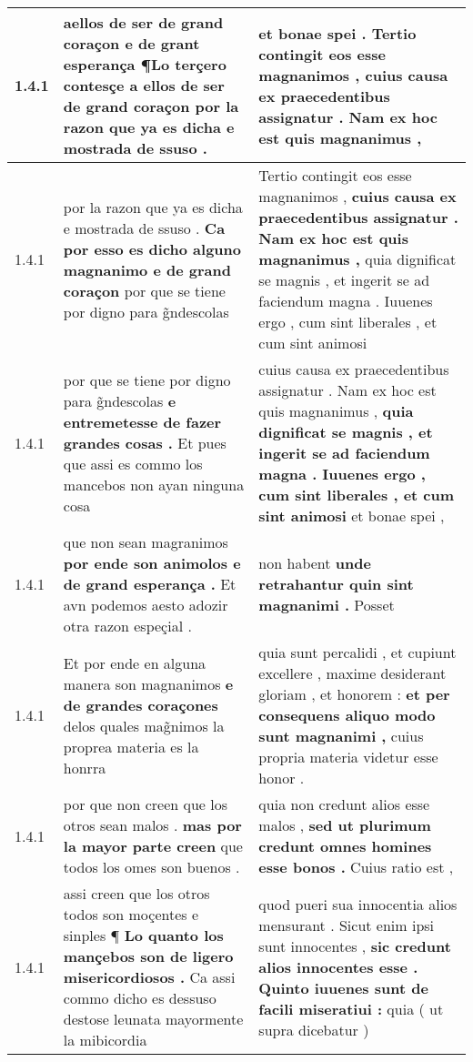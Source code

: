 \begin{tabular}{|p{1cm}|p{6.5cm}|p{6.5cm}|}
1.4.1 & aellos de ser de grand coraçon e de grant esperança \textbf{ ¶Lo terçero contesçe a ellos de ser de grand coraçon } por la razon que ya es dicha e mostrada de ssuso . & et bonae spei . \textbf{ Tertio contingit eos esse magnanimos , } cuius causa ex praecedentibus assignatur . Nam ex hoc est quis magnanimus , \\\hline
1.4.1 & por la razon que ya es dicha e mostrada de ssuso . \textbf{ Ca por esso es dicho alguno magnanimo e de grand coraçon } por que se tiene por digno para g̃ndescolas & Tertio contingit eos esse magnanimos , \textbf{ cuius causa ex praecedentibus assignatur . Nam ex hoc est quis magnanimus , } quia dignificat se magnis , et ingerit se ad faciendum magna . Iuuenes ergo , cum sint liberales , et cum sint animosi \\\hline
1.4.1 & por que se tiene por digno para g̃ndescolas \textbf{ e entremetesse de fazer grandes cosas . } Et pues que assi es commo los mancebos non ayan ninguna cosa & cuius causa ex praecedentibus assignatur . Nam ex hoc est quis magnanimus , \textbf{ quia dignificat se magnis , et ingerit se ad faciendum magna . Iuuenes ergo , cum sint liberales , et cum sint animosi } et bonae spei , \\\hline
1.4.1 & que non sean magranimos \textbf{ por ende son animolos e de grand esperança . } Et avn podemos aesto adozir otra razon espeçial . & non habent \textbf{ unde retrahantur quin sint magnanimi . } Posset \\\hline
1.4.1 & Et por ende en alguna manera son magnanimos \textbf{ e de grandes coraçones } delos quales mag̃nimos la proprea materia es la honrra & quia sunt percalidi , et cupiunt excellere , maxime desiderant gloriam , et honorem : \textbf{ et per consequens aliquo modo sunt magnanimi , } cuius propria materia videtur esse honor . \\\hline
1.4.1 & por que non creen que los otros sean malos . \textbf{ mas por la mayor parte creen } que todos los omes son buenos . & quia non credunt alios esse malos , \textbf{ sed ut plurimum credunt omnes homines esse bonos . } Cuius ratio est , \\\hline
1.4.1 & assi creen que los otros todos son moçentes e sinples ¶ \textbf{ Lo quanto los mançebos son de ligero misericordiosos . } Ca assi commo dicho es dessuso destose leunata mayormente la mibicordia & quod pueri sua innocentia alios mensurant . Sicut enim ipsi sunt innocentes , \textbf{ sic credunt alios innocentes esse . Quinto iuuenes sunt de facili miseratiui : } quia ( ut supra dicebatur ) \\\hline

\end{tabular}
